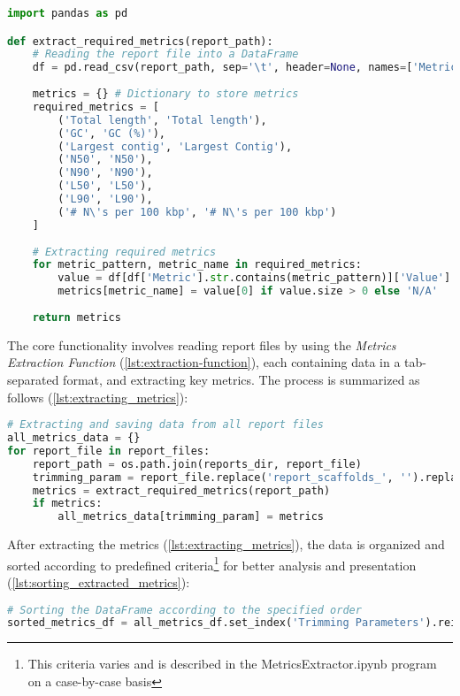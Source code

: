 \begin{lstlisting}[language=Python, caption=Metrics Extraction Function, label={lst:extraction-function}]
import pandas as pd

def extract_required_metrics(report_path):
    # Reading the report file into a DataFrame
    df = pd.read_csv(report_path, sep='\t', header=None, names=['Metric', 'Value'])
    
    metrics = {} # Dictionary to store metrics
    required_metrics = [
        ('Total length', 'Total length'),
        ('GC', 'GC (%)'),
        ('Largest contig', 'Largest Contig'),
        ('N50', 'N50'),
        ('N90', 'N90'),
        ('L50', 'L50'),
        ('L90', 'L90'),
        ('# N\'s per 100 kbp', '# N\'s per 100 kbp')
    ]
    
    # Extracting required metrics
    for metric_pattern, metric_name in required_metrics:
        value = df[df['Metric'].str.contains(metric_pattern)]['Value'].values
        metrics[metric_name] = value[0] if value.size > 0 else 'N/A'
    
    return metrics
\end{lstlisting}

The core functionality involves reading report files by using the \textit{Metrics Extraction Function} (\autoref{lst:extraction-function}), each containing data in a tab-separated format, and extracting key \gls{metrics}. The process is summarized as follows (\autoref{lst:extracting_metrics}):

\begin{lstlisting}[language=Python, label={lst:extracting_metrics}, caption=Extracting Metrics from Report Files]
# Extracting and saving data from all report files
all_metrics_data = {}
for report_file in report_files:
    report_path = os.path.join(reports_dir, report_file)
    trimming_param = report_file.replace('report_scaffolds_', '').replace('.tsv', '')
    metrics = extract_required_metrics(report_path)
    if metrics:
        all_metrics_data[trimming_param] = metrics
\end{lstlisting}

After extracting the \gls{metrics} (\autoref{lst:extracting_metrics}), the data is organized and sorted according to predefined criteria\footnote{This criteria varies and is described in the MetricsExtractor.ipynb program on a case-by-case basis} for better analysis and presentation (\autoref{lst:sorting_extracted_metrics}):

\begin{lstlisting}[language=Python, label={lst:sorting_extracted_metrics}, caption=Sorting Extracted Metrics]
# Sorting the DataFrame according to the specified order
sorted_metrics_df = all_metrics_df.set_index('Trimming Parameters').reindex(sorting_order).reset_index()
\end{lstlisting}


